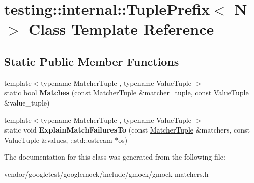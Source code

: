 \hypertarget{classtesting_1_1internal_1_1_tuple_prefix}{}\section{testing\+:\+:internal\+:\+:Tuple\+Prefix$<$ N $>$ Class Template Reference}
\label{classtesting_1_1internal_1_1_tuple_prefix}
\subsection*{Static Public Member Functions}
\begin{DoxyCompactItemize}
\item 
\mbox{\label{classtesting_1_1internal_1_1_tuple_prefix_ada24ceee73c02e3bb7f8264143170f7a}} 
{\footnotesize template$<$typename Matcher\+Tuple , typename Value\+Tuple $>$ }\\static bool {\bfseries Matches} (const \hyperlink{structtesting_1_1internal_1_1_matcher_tuple}{Matcher\+Tuple} \&matcher\+\_\+tuple, const Value\+Tuple \&value\+\_\+tuple)
\item 
\mbox{\label{classtesting_1_1internal_1_1_tuple_prefix_a0ffd38ce90ae6da645a5655aefac5bb7}} 
{\footnotesize template$<$typename Matcher\+Tuple , typename Value\+Tuple $>$ }\\static void {\bfseries Explain\+Match\+Failures\+To} (const \hyperlink{structtesting_1_1internal_1_1_matcher_tuple}{Matcher\+Tuple} \&matchers, const Value\+Tuple \&values, \+::std\+::ostream $\ast$os)
\end{DoxyCompactItemize}


The documentation for this class was generated from the following file\+:\begin{DoxyCompactItemize}
\item 
vendor/googletest/googlemock/include/gmock/gmock-\/matchers.\+h\end{DoxyCompactItemize}
